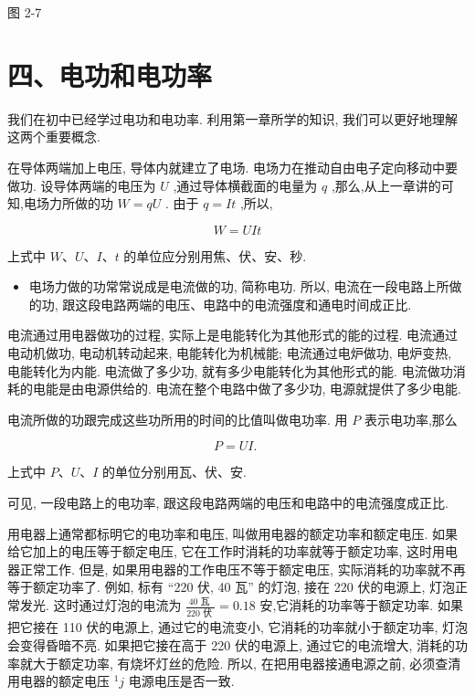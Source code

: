 \documentclass[10pt]{article}
\begin{document}
图 2-7

\section*{四、电功和电功率}

我们在初中已经学过电功和电功率. 利用第一章所学的知识, 我们可以更好地理解这两个重要概念.

在导体两端加上电压, 导体内就建立了电场. 电场力在推动自由电子定向移动中要做功. 设导体两端的电压为 \(U\) ,通过导体横截面的电量为 \(q\) ,那么,从上一章讲的可知,电场力所做的功 \(W = {qU}\) . 由于 \(q = {It}\) ,所以,

\[
W = {UIt}
\]

上式中 \(W\text{、}U\text{、}I\text{、}t\) 的单位应分别用焦、伏、安、秒.

\begin{itemize}
\item 电场力做的功常常说成是电流做的功, 简称电功. 所以, 电流在一段电路上所做的功, 跟这段电路两端的电压、电路中的电流强度和通电时间成正比.
\end{itemize}

电流通过用电器做功的过程, 实际上是电能转化为其他形式的能的过程. 电流通过电动机做功, 电动机转动起来, 电能转化为机械能; 电流通过电炉做功, 电炉变热, 电能转化为内能. 电流做了多少功, 就有多少电能转化为其他形式的能. 电流做功消耗的电能是由电源供给的. 电流在整个电路中做了多少功, 电源就提供了多少电能.

电流所做的功跟完成这些功所用的时间的比值叫做电功率. 用 \(P\) 表示电功率,那么

\[
P = {UI}\text{. }
\]

上式中 \(P\text{、}U\text{、}I\) 的单位分别用瓦、伏、安.

可见, 一段电路上的电功率, 跟这段电路两端的电压和电路中的电流强度成正比.

用电器上通常都标明它的电功率和电压, 叫做用电器的额定功率和额定电压. 如果给它加上的电压等于额定电压, 它在工作时消耗的功率就等于额定功率, 这时用电器正常工作. 但是, 如果用电器的工作电压不等于额定电压, 实际消耗的功率就不再等于额定功率了. 例如, 标有 “220 伏, 40 瓦” 的灯泡, 接在 220 伏的电源上, 灯泡正常发光. 这时通过灯泡的电流为 \(\frac{{40}\text{ 瓦 }}{{220}\text{ 伏 }} = {0.18}\) 安,它消耗的功率等于额定功率. 如果把它接在 110 伏的电源上, 通过它的电流变小, 它消耗的功率就小于额定功率, 灯泡会变得昏暗不亮. 如果把它接在高于 220 伏的电源上, 通过它的电流增大, 消耗的功率就大于额定功率, 有烧坏灯丝的危险. 所以, 在把用电器接通电源之前, 必须查清用电器的额定电压 \({}^{1}j\) 电源电压是否一致.
\end{document}
